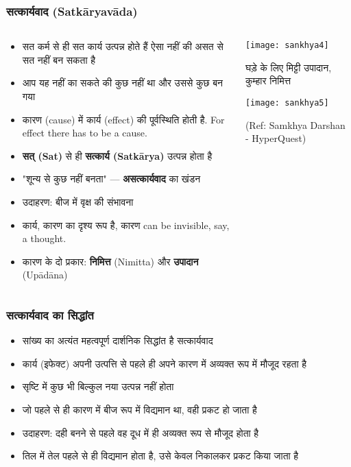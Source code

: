 \begin{frame}[fragile]\frametitle{सत्कार्यवाद (Satkāryavāda)}
\begin{columns}
    \begin{column}[T]{0.6\linewidth}
      \begin{itemize}
		\item सत कर्म से ही सत कार्य उत्पन्न होते हैं ऐसा नहीं की असत से सत नहीं बन सकता है 
		\item आप यह नहीं का सकते की कुछ नहीं था और उससे कुछ बन गया
        \item कारण (cause) में कार्य (effect) की पूर्वस्थिति होती है. For effect there has to be a cause.
        \item \textbf{सत् (Sat)} से ही \textbf{सत्कार्य (Satkārya)} उत्पन्न होता है
        \item "शून्य से कुछ नहीं बनता" — \textbf{असत्कार्यवाद} का खंडन
        \item उदाहरण: बीज में वृक्ष की संभावना
        \item कार्य, कारण का दृश्य रूप है, कारण can be invisible, say, a thought.
        \item कारण के दो प्रकार: \textbf{निमित्त} (Nimitta) और \textbf{उपादान} (Upādāna)

      \end{itemize}
    \end{column}
    \begin{column}[T]{0.4\linewidth}
      \begin{center}
        \texttt{[image: sankhya4]}
		
		घड़े के लिए मिट्टी उपादान, कुम्हार निमित्त
		
        \texttt{[image: sankhya5]}
		
		{\tiny (Ref: Samkhya Darshan - HyperQuest)}
		
      \end{center}	
    \end{column}
\end{columns}
\end{frame}

\begin{frame}[fragile]\frametitle{सत्कार्यवाद का सिद्धांत}
      \begin{itemize}
	\item सांख्य का अत्यंत महत्वपूर्ण दार्शनिक सिद्धांत है सत्कार्यवाद
	\item कार्य (इफेक्ट) अपनी उत्पत्ति से पहले ही अपने कारण में अव्यक्त रूप में मौजूद रहता है
	\item सृष्टि में कुछ भी बिल्कुल नया उत्पन्न नहीं होता
	\item जो पहले से ही कारण में बीज रूप में विद्यमान था, वही प्रकट हो जाता है
	\item उदाहरण: दही बनने से पहले वह दूध में ही अव्यक्त रूप से मौजूद होता है
	\item तिल में तेल पहले से ही विद्यमान होता है, उसे केवल निकालकर प्रकट किया जाता है
	  \end{itemize}
\end{frame}

